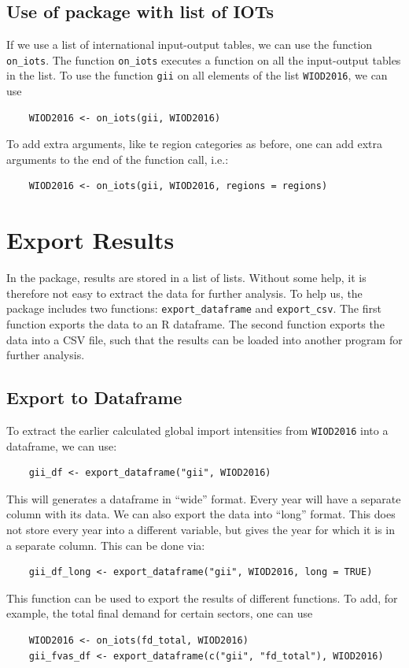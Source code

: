 \documentclass[10pt,a4paper]{paper}
\begin{document}
\begin{itemize}
	\subsection{Use of package with list of IOTs}
	If we use a list of international input-output tables, we can use the function \texttt{on\_iots}. The function \texttt{on\_iots} executes a function on all the input-output tables in the list. To use the function \texttt{gii} on all elements of the list \texttt{WIOD2016}, we can use
	\begin{Verbatim}
	WIOD2016 <- on_iots(gii, WIOD2016)
	\end{Verbatim}
	To add extra arguments, like te region categories as before, one can add extra arguments to the end of the function call, i.e.:
	\begin{Verbatim}
	WIOD2016 <- on_iots(gii, WIOD2016, regions = regions)
	\end{Verbatim}
	
	\section{Export Results}
	In the package, results are stored in a list of lists. Without some help, it is therefore not easy to extract the data for further analysis. To help us, the package includes two functions: \texttt{export\_dataframe} and \texttt{export\_csv}. The first function exports the data to an R dataframe. The second function exports the data into a CSV file, such that the results can be loaded into another program for further analysis.
	\subsection{Export to Dataframe}
	
	To extract the earlier calculated global import intensities from \texttt{WIOD2016} into a dataframe, we can use:
	\begin{Verbatim}
	gii_df <- export_dataframe("gii", WIOD2016)
	\end{Verbatim}
	This will generates a dataframe in ``wide'' format. Every year will have a separate column with its data. We can also export the data into ``long'' format. This does not store every year into a different variable, but gives the year for which it is in a separate column. This can be done via:
	\begin{Verbatim}
	gii_df_long <- export_dataframe("gii", WIOD2016, long = TRUE)
	\end{Verbatim}
	This function can be used to export the results of different functions. To add, for example, the total final demand for certain sectors, one can use
	\begin{Verbatim}
	WIOD2016 <- on_iots(fd_total, WIOD2016)
	gii_fvas_df <- export_dataframe(c("gii", "fd_total"), WIOD2016)
	\end{Verbatim}
		

\end{itemize}
\end{document}

